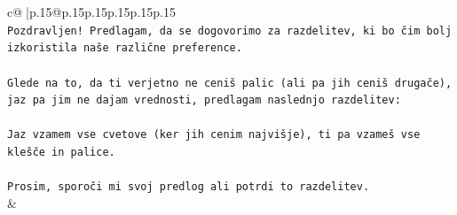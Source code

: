 \documentclass{article}
\begin{document}
{\begin{supertabular}{c@{$\;$}|p{.15\linewidth}@{}p{.15\linewidth}p{.15\linewidth}p{.15\linewidth}p{.15\linewidth}p{.15\linewidth}}
{{{\\ 
\texttt{Pozdravljen! Predlagam, da se dogovorimo za razdelitev, ki bo čim bolj izkoristila naše različne preference.} \\
\\ 
\texttt{Glede na to, da ti verjetno ne ceniš palic (ali pa jih ceniš drugače), jaz pa jim ne dajam vrednosti, predlagam naslednjo razdelitev:} \\
\\ 
\texttt{Jaz vzamem vse cvetove (ker jih cenim najvišje), ti pa vzameš vse klešče in palice.} \\
\\ 
\texttt{Prosim, sporoči mi svoj predlog ali potrdi to razdelitev.} \\
            }
        }
    }
    & \\ \\


\end{supertabular}}
\end{document}
